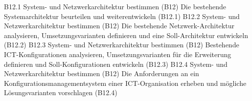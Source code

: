 \templateCard
  {B12.1}
  {System- und Netzwerkarchitektur bestimmen (B12)}
  {Die bestehende Systemarchitektur beurteilen und weiterentwickeln (B12.1)}
\templateCard
  {B12.2}
  {System- und Netzwerkarchitektur bestimmen (B12)}
  {Die bestehende Netzwerk-Architektur analysieren, Umsetzungsvarianten definieren und eine Soll-Architektur entwickeln (B12.2)}
\templateCard
  {B12.3}
  {System- und Netzwerkarchitektur bestimmen (B12)}
  {Bestehende ICT-Konfigurationen analysieren, Umsetzungsvarianten für die Erweiterung definieren und Soll-Konfigurationen entwickeln (B12.3)}
\templateCard
  {B12.4}
  {System- und Netzwerkarchitektur bestimmen (B12)}
  {Die Anforderungen an ein Konfigurationsmanagementsystem einer ICT-Organisation erheben und mögliche Lösungsvarianten vorschlagen (B12.4)}
